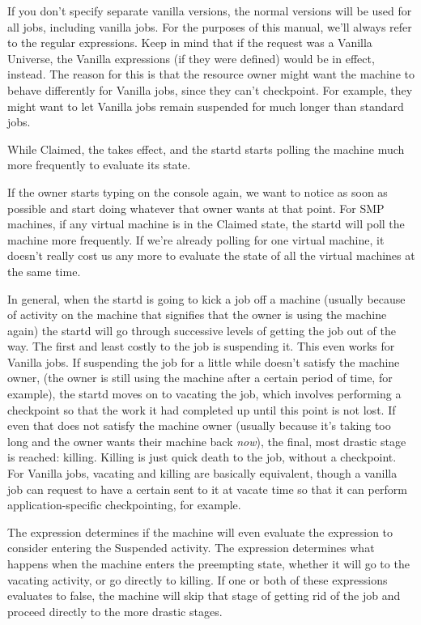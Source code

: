 If you don't specify separate vanilla versions, the normal versions
will be used for all jobs, including vanilla jobs.  
For the purposes of this manual, we'll always refer to the regular 
expressions.
Keep in mind that if the request was a Vanilla Universe, the Vanilla
expressions (if they were defined) would be in effect, instead.
The reason for this is that the resource owner might want the machine
to behave differently for Vanilla jobs, since they can't checkpoint.
For example, they might want to let Vanilla jobs remain suspended for
much longer than standard jobs.

While Claimed, the  takes effect, and the
startd starts polling the machine much more frequently to evaluate its
state.

If the owner starts typing on the console again, we want to notice as
soon as possible and start doing whatever that owner wants at that
point.
For SMP machines, if any virtual machine is in the Claimed state, the
startd will poll the machine more frequently.
If we're already polling for one virtual machine, it doesn't really
cost us any more to evaluate the state of all the virtual machines at
the same time.

In general, when the startd is going to kick a job off a machine
(usually because of activity on the machine that signifies that the
owner is using the machine again) the startd will go through
successive levels of getting the job out of the way.
The first and least costly to the job is suspending it.
This even works for Vanilla jobs.
If suspending the job for a little while doesn't satisfy the machine
owner, (the owner is still using the machine after a certain period of
time, for example), the startd moves on to vacating the job, which
involves performing a checkpoint so that the work it had completed up
until this point is not lost.
If even that does not satisfy the machine owner (usually because it's
taking too long and the owner wants their machine back \emph{now}),
the final, most drastic stage is reached: killing.  
Killing is just quick death to the job, without a checkpoint.  
For Vanilla jobs, vacating and killing are basically equivalent,
though a vanilla job can request to have a certain  sent to it at vacate time so that it can perform
application-specific checkpointing, for example.

The  expression determines if the machine will even
evaluate the  expression to consider entering the
Suspended activity.
The  expression determines what happens when the
machine enters the preempting state, whether it will go to the vacating
activity, or go directly to killing. 
If one or both of these expressions evaluates to false, the machine
will skip that stage of getting rid of the job and proceed directly to
the more drastic stages.

